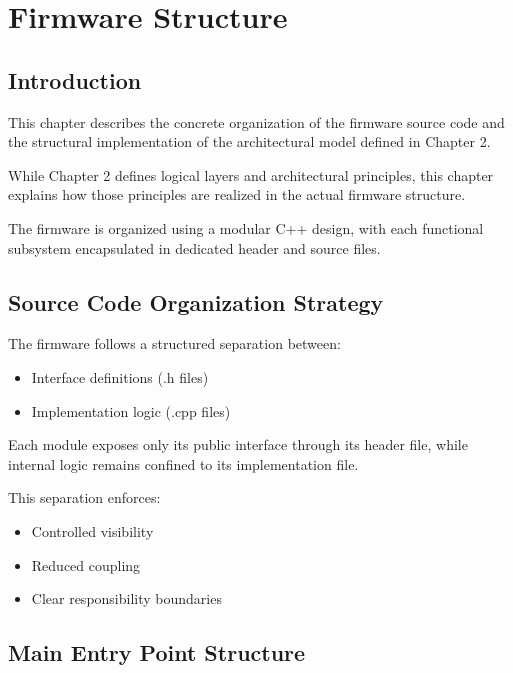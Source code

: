 \chapter{Firmware Structure}

\section{Introduction}

This chapter describes the concrete organization of the firmware source code and the structural implementation of the architectural model defined in Chapter 2.

While Chapter 2 defines logical layers and architectural principles, this chapter explains how those principles are realized in the actual firmware structure.

The firmware is organized using a modular C++ design, with each functional subsystem encapsulated in dedicated header and source files.


\section{Source Code Organization Strategy}

The firmware follows a structured separation between:

\begin{itemize}
	\item Interface definitions (.h files)
	\item Implementation logic (.cpp files)
\end{itemize}

Each module exposes only its public interface through its header file, while internal logic remains confined to its implementation file.

This separation enforces:

\begin{itemize}
	\item Controlled visibility
	\item Reduced coupling
	\item Clear responsibility boundaries
\end{itemize}


\section{Main Entry Point Structure}


